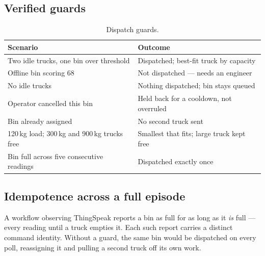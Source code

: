 \documentclass[11pt,a4paper]{article}
\begin{document}
\subsection{Verified guards}

\begin{table}[h]
\centering\small
\begin{tabularx}{\textwidth}{Xl}
\toprule
\textbf{Scenario} & \textbf{Outcome} \\
\midrule
Two idle trucks, one bin over threshold          & Dispatched; best-fit truck by capacity \\
Offline bin scoring 68                           & Not dispatched --- needs an engineer \\
No idle trucks                                   & Nothing dispatched; bin stays queued \\
Operator cancelled this bin                      & Held back for a cooldown, not overruled \\
Bin already assigned                             & No second truck sent \\
120\,kg load; 300\,kg and 900\,kg trucks free    & Smallest that fits; large truck kept free \\
Bin full across five consecutive readings        & Dispatched exactly once \\
\bottomrule
\end{tabularx}
\caption{Dispatch guards.}
\end{table}

\subsection{Idempotence across a full episode}

A workflow observing ThingSpeak reports a bin as full for as long as it
\emph{is} full --- every reading until a truck empties it. Each such
report carries a distinct command identity. Without a guard, the same bin
would be dispatched on every poll, reassigning it and pulling a second
truck off its own work.
\end{document}
